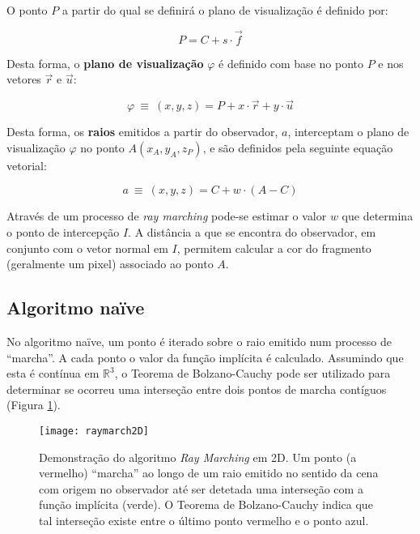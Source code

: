 O ponto $P$ a partir do qual se definirá o plano de visualização é definido por:

\begin{equation}
	P = C + s \cdot \overrightarrow{f}
	\label{eq::cast:pontoP}
\end{equation}

Desta forma, o \textbf{plano de visualização} $\varphi$ é definido com base no ponto $P$ e nos vetores $\overrightarrow{r}$ e $\overrightarrow{u}$:

\begin{equation}
	\varphi ~\equiv~ (x,y,z) = P + x \cdot \overrightarrow{r} + y \cdot \overrightarrow{u}
	\label{eq::cast:plano}
\end{equation}

Desta forma, os \textbf{raios} emitidos a partir do observador, $a$, interceptam o plano de visualização $\varphi$ no ponto $A(x_A, y_A, z_P)$, e são definidos pela seguinte equação vetorial:

\begin{equation}
	a ~\equiv~ (x,y,z) = C + w \cdot (A - C)
	\label{eq::cast:ray}
\end{equation}

Através de um processo de \textit{ray marching} pode-se estimar o valor $w$ que determina o ponto de intercepção $I$. A distância a que se encontra do observador, em conjunto com o vetor normal em $I$, permitem calcular a cor do fragmento (geralmente um pixel) associado ao ponto $A$.


\subsection{Algoritmo naïve}
\label{ssec::art:raymarch:naive}


No algoritmo naïve, um ponto é iterado sobre o raio emitido num processo de ``marcha''. A cada ponto o valor da função implícita é calculado. Assumindo que esta é contínua em $\mathbb{R}^3$, o Teorema de Bolzano-Cauchy pode ser utilizado para determinar se ocorreu uma interseção entre dois pontos de marcha contíguos (Figura \ref{fig::rmarching2D}).

\begin{figure}[!bp]
	\centering
	\texttt{[image: raymarch2D]}
	\caption[Algoritmo \textit{Ray Marching} em 2D]{Demonstração do algoritmo \textit{Ray Marching} em 2D. Um ponto (a vermelho) ``marcha'' ao longo de um raio emitido no sentido da cena com origem no observador até ser detetada uma interseção com a função implícita (verde). O Teorema de Bolzano-Cauchy indica que tal interseção existe entre o último ponto vermelho e o ponto azul.}
	\label{fig::rmarching2D}
\end{figure}

